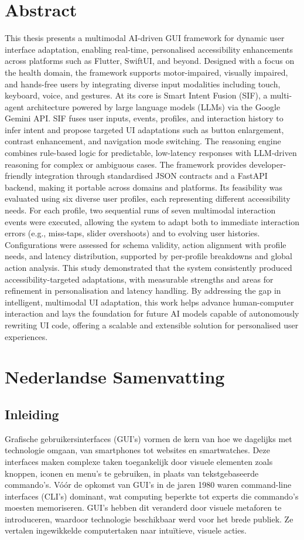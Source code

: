 \documentclass[openany]{book}
\begin{document}
\chapter*{Abstract}
This thesis presents a multimodal AI-driven GUI framework for dynamic user interface adaptation, enabling real-time, personalised accessibility enhancements across platforms such as Flutter, SwiftUI, and beyond. Designed with a focus on the health domain, the framework supports motor-impaired, visually impaired, and hands-free users by integrating diverse input modalities including touch, keyboard, voice, and gestures.
At its core is Smart Intent Fusion (SIF), a multi-agent architecture powered by large language models (LLMs) via the Google Gemini API. SIF fuses user inputs, events, profiles, and interaction history to infer intent and propose targeted UI adaptations such as button enlargement, contrast enhancement, and navigation mode switching. The reasoning engine combines rule-based logic for predictable, low-latency responses with LLM-driven reasoning for complex or ambiguous cases.
The framework provides developer-friendly integration through standardised JSON contracts and a FastAPI backend, making it portable across domains and platforms. Its feasibility was evaluated using six diverse user profiles, each representing different accessibility needs. For each profile, two sequential runs of seven multimodal interaction events were executed, allowing the system to adapt both to immediate interaction errors (e.g., miss-taps, slider overshoots) and to evolving user histories. Configurations were assessed for schema validity, action alignment with profile needs, and latency distribution, supported by per-profile breakdowns and global action analysis. This study demonstrated that the system consistently produced accessibility-targeted adaptations, with measurable strengths and areas for refinement in personalisation and latency handling.
By addressing the gap in intelligent, multimodal UI adaptation, this work helps advance human-computer interaction and lays the foundation for future AI models capable of autonomously rewriting UI code, offering a scalable and extensible solution for personalised user experiences.

\chapter*{Nederlandse Samenvatting}
\section*{Inleiding}
Grafische gebruikersinterfaces (GUI's) vormen de kern van hoe we dagelijks met technologie omgaan, van smartphones tot websites en smartwatches. Deze interfaces maken complexe taken toegankelijk door visuele elementen zoals knoppen, iconen en menu's te gebruiken, in plaats van tekstgebaseerde commando's. Vóór de opkomst van GUI's in de jaren 1980 waren command-line interfaces (CLI's) dominant, wat computing beperkte tot experts die commando's moesten memoriseren. GUI's hebben dit veranderd door visuele metaforen te introduceren, waardoor technologie beschikbaar werd voor het brede publiek. Ze vertalen ingewikkelde computertaken naar intuïtieve, visuele acties.
\end{document}
